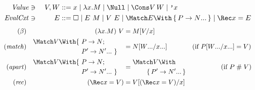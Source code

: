 \begin{figure}[t!]
\centering
\small
\begin{alignat*}{2}
  \mathit{Value} &\ni{}& V, W
  &::= x
  \mid \lambda x. M
  \mid \Null
  \mid \Cons V \, W
  \mid \q{x}
  \\
  \mathit{EvalCxt} &\ni{}& E
  &::= \hole
  \mid E ~ M
  \mid V ~ E
  \mid \Match E \With \set{\many{P \to N}}
  \mid \Rec x = E
\end{alignat*}
\begin{align*}
  (\beta)
  &&
  (\lambda x. M) ~ V
  &=
  M\subst{x}{V}
  \\
  (\mathit{match})
  &&
  \begin{aligned}
    &\Match V \With
    \begin{aligned}[t]
    \{~ &P \to N; \\
    &\many{P' \to N'}~\}
    \end{aligned}
  \end{aligned}
  &=
  N\subst{\many{x}}{\many{W}}
  &(\text{if } P\subst{\many{x}}{\many{W}} &= V)
  \\
  (\mathit{apart})
  &&
  \begin{aligned}
    &\Match V \With
    \begin{aligned}[t]
    \{~ &P \to N; \\
    &\many{P' \to N'}~\}
    \end{aligned}
  \end{aligned}
  &=
  \begin{aligned}
    &\Match V \With \\
    &\qquad \set{\many{P' \to N'}}
  \end{aligned}
  &(\text{if } P &\apart V)
  \\
  (\mathit{rec})
  &&
  (\Rec x = V)
  &=
  V\subst{x}{(\Rec x = V)}
\end{align*}


\end{figure}
